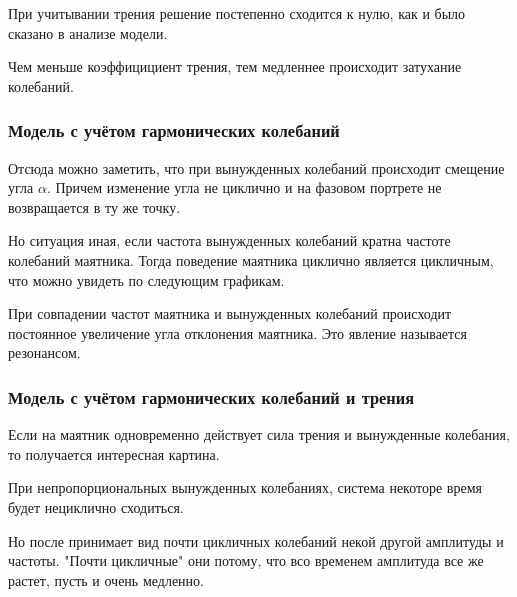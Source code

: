 			При учитывании трения решение постепенно сходится к нулю, как и было сказано в анализе модели.


			Чем меньше коэффицициент трения, тем медленнее происходит затухание колебаний.


		\subsubsection{Модель с учётом гармонических колебаний}

			Отсюда можно заметить, что при вынужденных колебаний происходит смещение угла \( \alpha \). Причем изменение угла не циклично и на фазовом портрете не возвращается в ту же точку.

			Но ситуация иная, если частота вынужденных колебаний кратна частоте колебаний маятника. Тогда поведение маятника циклично является цикличным, что можно увидеть по следующим графикам.


			При совпадении частот маятника и вынужденных колебаний происходит постоянное увеличение угла отклонения маятника. Это явление называется резонансом.


		\subsubsection{Модель с учётом гармонических колебаний и трения}

			Если на маятник одновременно действует сила трения и вынужденные колебания, то получается интересная картина. 

			При непропорциональных вынужденных колебаниях, система некоторе время будет нециклично сходиться.

			Но после принимает вид почти цикличных колебаний некой другой амплитуды и частоты. "Почти цикличные" они потому, что всо временем амплитуда все же растет, пусть и очень медленно.


